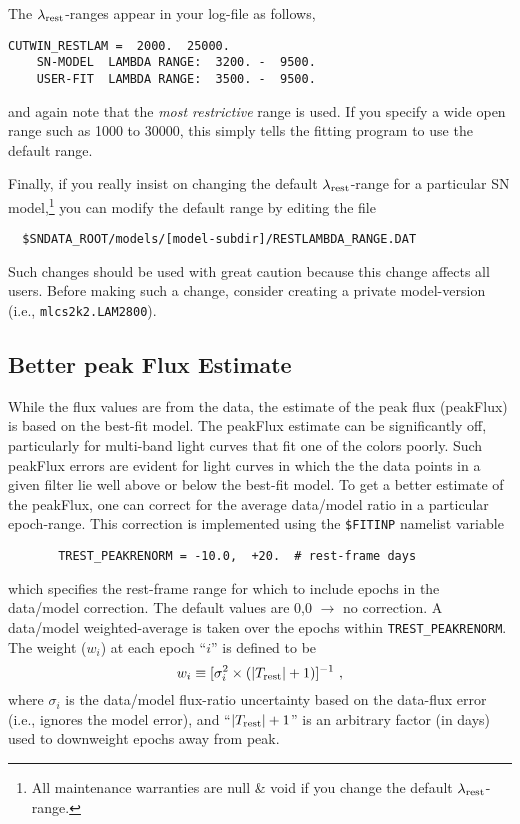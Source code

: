 \documentclass[12pt]{article}
\newcommand{\absTrest}{\vert T_{\rm rest}\vert}
\newcommand{\lamrest}{\lambda_{\rm rest}}
\begin{document}
The $\lamrest$-ranges appear in your log-file as follows,
%
\begin{Verbatim}[frame=single]
    CUTWIN_RESTLAM =  2000.  25000.
    SN-MODEL  LAMBDA RANGE:  3200. -  9500.
    USER-FIT  LAMBDA RANGE:  3500. -  9500.
\end{Verbatim}
and again note that the {\it most restrictive} range is used.
If you specify a wide open range such as 1000 to 30000, this 
simply tells the fitting program to use the default range.

Finally, if you really insist on changing the default
$\lamrest$-range for a particular 
SN model,\footnote{All maintenance warranties are null \& void
if you change the default $\lamrest$-range.
}
you can modify the default range by editing the file
\begin{verbatim}
  $SNDATA_ROOT/models/[model-subdir]/RESTLAMBDA_RANGE.DAT
\end{verbatim}
Such changes should be used with great caution because
this change affects all users. Before making such a change,
consider creating a private model-version
(i.e., {\tt mlcs2k2.LAM2800}).


   \clearpage
   \subsection{Better peak Flux Estimate}
   \label{subsec:peakFlux}

While the flux values are from the data, the estimate
of the peak flux (peakFlux) is based on the best-fit model.
The peakFlux estimate can be significantly off, 
particularly for multi-band light curves that fit
one of the colors poorly.
Such peakFlux errors are evident for light curves in which 
the the data points in a given filter lie well above or below 
the best-fit model.
To get a better estimate of the peakFlux, one can
correct for the average data/model ratio in
a particular epoch-range. This correction is implemented
using the {\tt \$FITINP} namelist variable
%
\begin{verbatim}
       TREST_PEAKRENORM = -10.0,  +20.  # rest-frame days
\end{verbatim}
%
which specifies the rest-frame range for which to
include epochs in the data/model correction.
The default values are 0,0 $\to$ no correction.
A data/model weighted-average is taken over the
epochs within {\tt TREST\_PEAKRENORM}. 
The weight ($w_i$) at each epoch ``$i$''  is defined to be
%
\begin{equation}
   w_i \equiv [\sigma_i^2 \times ({\absTrest} +1) ]^{-1} ~,
\end{equation}
%
where $\sigma_i$ is the data/model flux-ratio uncertainty based 
on the data-flux error (i.e., ignores the model error),
and ``$\absTrest + 1$'' is an arbitrary factor (in days) 
used to downweight epochs away from peak.
\end{document}
